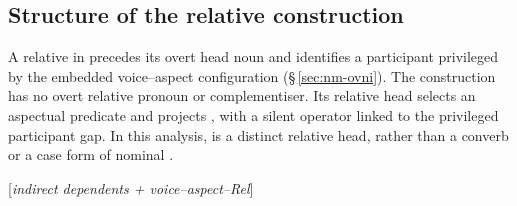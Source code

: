 \subsection{Structure of the relative construction}
\label{sec:th-rel-structure}

A relative in  precedes its overt head noun and identifies a
participant privileged by the embedded voice--aspect configuration
(§\,\ref{sec:nm-ovni}). The construction has no overt relative pronoun or
complementiser. Its relative head selects an aspectual predicate and projects
, with a silent operator linked to the privileged participant
gap. In this analysis,  is a distinct relative head, rather than a
converb or a case form of nominal .

\begin{center}
[\textit{indirect dependents + voice--aspect--Rel}]
\end{center}


